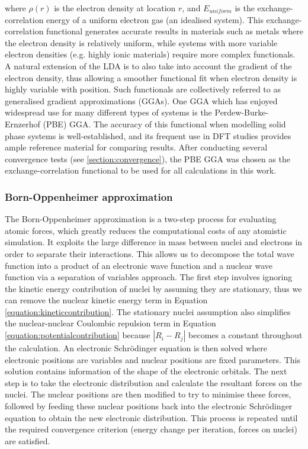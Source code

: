 where $\rho(r)$ is the electron density at location $r$, and $E_{uniform}$ is the exchange-correlation energy of a uniform electron gas (an idealised system). This exchange-correlation functional generates accurate results in materials such as metals where the electron density is relatively uniform, while systems with more variable electron densities (e.g. highly ionic materials) require more complex functionals. A natural extension of the LDA is to also take into account the gradient of the electron density, thus allowing a smoother functional fit when electron density is highly variable with position. Such functionals are collectively referred to as generalised gradient approximations (GGAs). One GGA which has enjoyed widespread use for many different types of systems is the Perdew-Burke-Ernzerhof (PBE) GGA. The accuracy of this functional when modelling solid phase systems is well-established, and its frequent use in DFT studies provides ample reference material for comparing results. After conducting several convergence tests (see \ref{section:convergence}), the PBE GGA was chosen as the exchange-correlation functional to be used for all calculations in this work.

\subsubsection{Born-Oppenheimer approximation}

The Born-Oppenheimer approximation is a two-step process for evaluating atomic forces, which greatly reduces the computational costs of any atomistic simulation. It exploits the large difference in mass between nuclei and electrons in order to separate their interactions. This allows us to decompose the total wave function into a product of an electronic wave function and a nuclear wave function via a separation of variables approach. The first step involves ignoring the kinetic energy contribution of nuclei by assuming they are stationary, thus we can remove the nuclear kinetic energy term in Equation \ref{equation:kineticcontribution}. The stationary nuclei assumption also simplifies the nuclear-nuclear Coulombic repulsion term in Equation \ref{equation:potentialcontribution} because $|R_i - R_j|$ becomes a constant throughout the calculation. An electronic Schr\"{o}dinger equation is then solved where electronic positions are variables and nuclear positions are fixed parameters. This solution contains information of the shape of the electronic orbitals. The next step is to take the electronic distribution and calculate the resultant forces on the nuclei. The nuclear positions are then modified to try to minimise these forces, followed by feeding these nuclear positions back into the electronic Schr\"{o}dinger equation to obtain the new electronic distribution. This process is repeated until the required convergence criterion (energy change per iteration, forces on nuclei) are satisfied.

